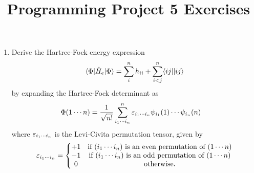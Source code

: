 \documentclass[fleqn,12pt]{article}
\title{Programming Project 5 Exercises}
\author{}
\date{}
\begin{document}
\maketitle

\begin{enumerate}
  \item Derive the Hartree-Fock energy expression
\begin{align}
  \langle\Phi|\hat{H}_e|\Phi\rangle
=
  \sum_i^n
  h_{ii}
+
  \sum_{i<j}^n
  \langle ij||ij\rangle
\end{align}
by expanding the Hartree-Fock determinant as
\begin{align}
&
  \Phi(1\cdots n)
=
  \dfrac{1}{\sqrt{n!}}
  \sum_{i_1\cdots i_n}^n
  \varepsilon_{i_1\cdots i_n}
  \psi_{i_1}(1)\cdots\psi_{i_n}(n)
\end{align}
where $\varepsilon_{i_1\cdots i_n}$ is the Levi-Civita permutation tensor, given by
\begin{align}
  \varepsilon_{i_1\cdots i_n}
=
  \left\{\begin{matrix}
    +1&\text{if $(i_1\cdots i_n)$ is an even permutation of $(1\cdots n)$}\\
    -1&\text{if $(i_1\cdots i_n)$ is an odd permutation of $(1\cdots n)$}\\
    0&\text{otherwise.}
  \end{matrix}\right.
\end{align}


\end{enumerate}
\end{document}

